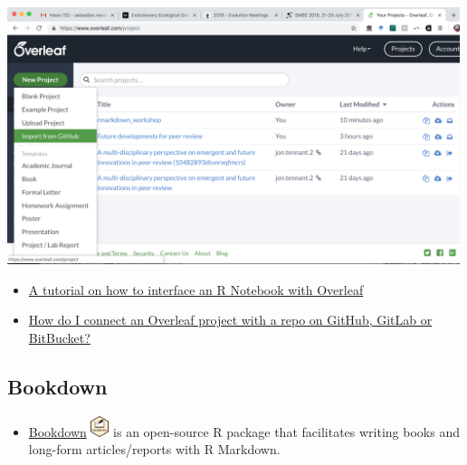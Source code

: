 \documentclass[]{article}
\providecommand{\tightlist}{%
  \setlength{\itemsep}{0pt}\setlength{\parskip}{0pt}}
\begin{document}
\includegraphics[width=5.20833in,height=\textheight]{../figures/overleaf_github.png}

\begin{itemize}
\item
  \href{https://medium.com/@arinbasu/a-tutorial-on-how-to-interface-an-r-notebook-with-overleaf-11f23c306cfd}{A
  tutorial on how to interface an R Notebook with Overleaf}
\item
  \href{https://www.overleaf.com/learn/how-to/How_do_I_connect_an_Overleaf_project_with_a_repo_on_GitHub,_GitLab_or_BitBucket\%3F}{How
  do I connect an Overleaf project with a repo on GitHub, GitLab or
  BitBucket?}
\end{itemize}

\hypertarget{bookdown}{%
\subsection{Bookdown}\label{bookdown}}

\begin{itemize}
\tightlist
\item
  \href{https://bookdown.org/}{Bookdown}
  \includegraphics[width=0.20833in,height=\textheight]{../figures/bookdown.png}
  is an open-source R package that facilitates writing books and
  long-form articles/reports with R Markdown.
\end{itemize}
\end{document}
